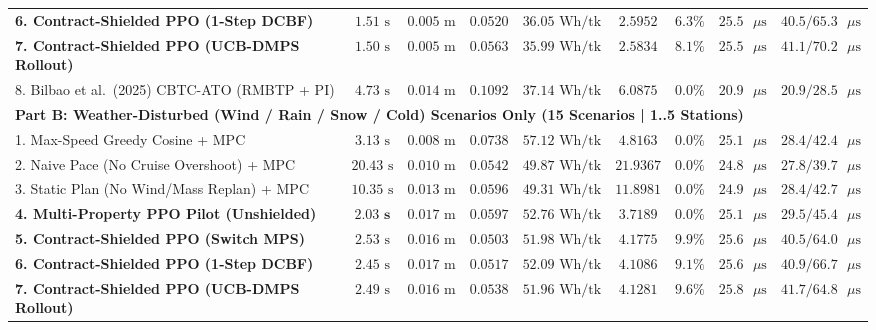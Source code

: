 \documentclass[10pt,a4paper]{article}
\begin{document}
\begin{table}[H]
{\begin{tabular}{lcccccccc}
\textbf{6. Contract-Shielded PPO (1-Step DCBF)} & $1.51\text{ s}$ & $0.005\text{ m}$ & $0.0520$ & $36.05\text{ Wh/tk}$ & $2.5952$ & $6.3\%$ & $25.5\text{ }\mu\text{s}$ & $40.5 / 65.3\text{ }\mu\text{s}$ \\
\textbf{7. Contract-Shielded PPO (UCB-DMPS Rollout)} & $1.50\text{ s}$ & $0.005\text{ m}$ & $0.0563$ & $35.99\text{ Wh/tk}$ & $2.5834$ & $8.1\%$ & $25.5\text{ }\mu\text{s}$ & $41.1 / 70.2\text{ }\mu\text{s}$ \\
8. Bilbao et al.\ (2025) CBTC-ATO (RMBTP + PI) \cite{bilbao2025} & $4.73\text{ s}$ & $0.014\text{ m}$ & $0.1092$ & $37.14\text{ Wh/tk}$ & $6.0875$ & $0.0\%$ & $20.9\text{ }\mu\text{s}$ & $20.9 / 28.5\text{ }\mu\text{s}$ \\
\midrule
\multicolumn{9}{l}{\textbf{Part B: Weather-Disturbed (Wind / Rain / Snow / Cold) Scenarios Only (15 Scenarios | 1..5 Stations)}} \\
\midrule
1. Max-Speed Greedy Cosine + MPC & $3.13\text{ s}$ & $0.008\text{ m}$ & $0.0738$ & $57.12\text{ Wh/tk}$ & $4.8163$ & $0.0\%$ & $25.1\text{ }\mu\text{s}$ & $28.4 / 42.4\text{ }\mu\text{s}$ \\
2. Naive Pace (No Cruise Overshoot) + MPC & $20.43\text{ s}$ & $0.010\text{ m}$ & $0.0542$ & $49.87\text{ Wh/tk}$ & $21.9367$ & $0.0\%$ & $24.8\text{ }\mu\text{s}$ & $27.8 / 39.7\text{ }\mu\text{s}$ \\
3. Static Plan (No Wind/Mass Replan) + MPC & $10.35\text{ s}$ & $0.013\text{ m}$ & $0.0596$ & $49.31\text{ Wh/tk}$ & $11.8981$ & $0.0\%$ & $24.9\text{ }\mu\text{s}$ & $28.4 / 42.7\text{ }\mu\text{s}$ \\
\textbf{4. Multi-Property PPO Pilot (Unshielded)} & $\mathbf{2.03\text{ s}}$ & $0.017\text{ m}$ & $0.0597$ & $52.76\text{ Wh/tk}$ & $\mathbf{3.7189}$ & $0.0\%$ & $25.1\text{ }\mu\text{s}$ & $29.5 / 45.4\text{ }\mu\text{s}$ \\
\textbf{5. Contract-Shielded PPO (Switch MPS)} & $2.53\text{ s}$ & $0.016\text{ m}$ & $\mathbf{0.0503}$ & $51.98\text{ Wh/tk}$ & $4.1775$ & $9.9\%$ & $25.6\text{ }\mu\text{s}$ & $40.5 / 64.0\text{ }\mu\text{s}$ \\
\textbf{6. Contract-Shielded PPO (1-Step DCBF)} & $2.45\text{ s}$ & $0.017\text{ m}$ & $0.0517$ & $52.09\text{ Wh/tk}$ & $4.1086$ & $9.1\%$ & $25.6\text{ }\mu\text{s}$ & $40.9 / 66.7\text{ }\mu\text{s}$ \\
\textbf{7. Contract-Shielded PPO (UCB-DMPS Rollout)} & $2.49\text{ s}$ & $0.016\text{ m}$ & $0.0538$ & $51.96\text{ Wh/tk}$ & $4.1281$ & $9.6\%$ & $25.8\text{ }\mu\text{s}$ & $41.7 / 64.8\text{ }\mu\text{s}$ \\

\end{tabular}}
\end{table}
\end{document}
